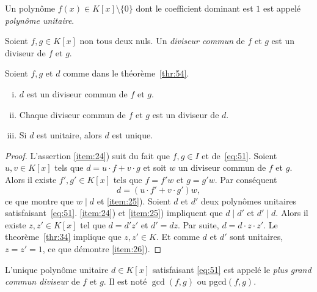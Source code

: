 \begin{definition}
  \label{def:54}
  Un polynôme $f(x) ∈ K[x] \setminus \{0\}$  dont le coefficient dominant est $1$ est appelé \emph{polynôme unitaire}. 
\end{definition}


\begin{definition}
  \label{def:55}
  Soient $f,g ∈ K[x]$ non tous deux nuls. Un \emph{diviseur commun} de $f$ et $g$  est un diviseur de $f$ et $g$. 
\end{definition}

\begin{theorem}
  \label{thr:55}
  Soient $f, g$ et $d$  comme dans le  théorème~\ref{thr:54}.
  \begin{enumerate}[i)]
  \item $d$ est un diviseur commun de $f$ et $g$. \label{item:24}
  \item Chaque diviseur commun de $f$ et $g$ est un diviseur de $d$. \label{item:25}
  \item Si $d$ est unitaire, alors $d$ est unique.  \label{item:26}
  \end{enumerate}
\end{theorem}

\begin{proof}
  L'assertion \ref{item:24}) suit du fait que $f,g ∈ I$ et de~\eqref{eq:51}. Soient $u,v ∈K[x]$  tels que
  $    d = u⋅f  + v ⋅ g $
  et soit $w$ un diviseur commun de $f$ et $g$. Alors il existe $f',g' ∈K[x]$ tels que  $f = f' w$ et $g = g' w$. Par conséquent
  \begin{displaymath}
    d = (u⋅f'  + v ⋅ g') w,
  \end{displaymath}
  ce que montre que $w \mid d$ et \ref{item:25}). 
  Soient $d$ et $d'$ deux polynômes unitaires satisfaisant~\eqref{eq:51}. \ref{item:24}) et \ref{item:25}) impliquent que $d \mid d'$ et $d' \mid d$.
  Alors il existe $z,z' ∈K[x]$ tel que $d = d' z'$ et $d' = dz$. Par suite, $d = d ⋅z ⋅ z'$. Le theorème~\ref{thr:34} implique que $z,z' ∈ K$. Et comme $d$ et $d'$ sont unitaires, $z=z'=1$, ce que démontre \ref{item:26}). 
\end{proof}

\begin{definition}
  \label{def:56}
  L'unique polynôme unitaire $d ∈ K[x]$ satisfaisant \eqref{eq:51} est appelé  le \emph{plus grand commun diviseur} de $f$ et $g$. Il est noté $\gcd(f,g)$ ou pgcd$(f,g)$.
\end{definition}

